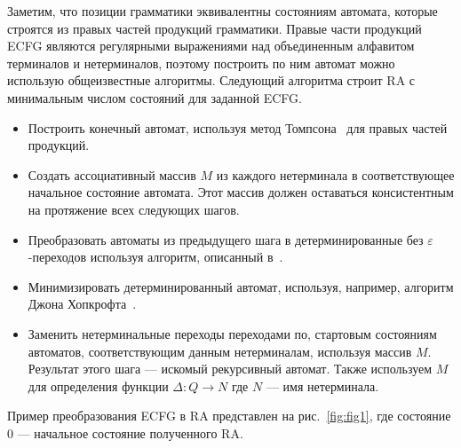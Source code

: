 Заметим, что позиции грамматики эквивалентны состояниям автомата, которые 
строятся из правых частей продукций грамматики. Правые части продукций ECFG являются регулярными
выражениями над объединенным алфавитом терминалов и нетерминалов, поэтому построить по ним автомат можно использую общеизвестные алгоритмы.
Следующий алгоритма строит RA с минимальным числом состояний для заданной ECFG.
\begin{itemize}
	\item Построить конечный автомат, используя метод Томпсона~\cite{Thompson:1968:PTR:363347.363387} для правых
	частей продукций.
	\item Создать ассоциативный массив $M$ из каждого нетерминала в соответствующее начальное состояние автомата.
	Этот массив должен оставаться консистентным на протяжение всех следующих шагов.
	\item Преобразовать автоматы из предыдущего шага в детерминированные без 
	$\varepsilon$-переходов используя алгоритм, описанный в~\cite{aho1974design}.
	\item Минимизировать детерминированный автомат, используя, например, алгоритм
	Джона Хопкрофта~\cite{hopcroft1971n}.
	\item Заменить нетерминальные переходы переходами по, стартовым состояниям автоматов,
	соответствующим данным нетерминалам, используя массив $M$. Результат 
	этого шага --- искомый рекурсивный автомат. Также используем $M$
	для определения функции $\Delta : Q \to N$ где $N$ --- имя нетерминала.
\end{itemize}
Пример преобразования ECFG в RA представлен на рис.~\ref{fig:fig1}, где состояние
0 --- начальное состояние полученного RA.
